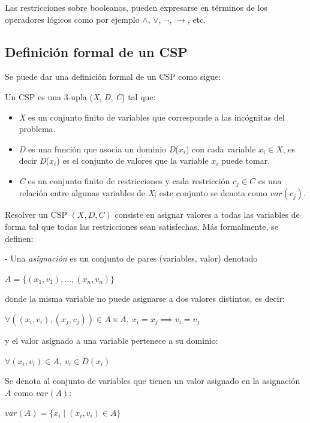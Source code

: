 \documentclass{llncs}
\begin{document}
      Las restricciones sobre booleanos, pueden expresarse en términos de los operadores
      lógicos como por ejemplo $\wedge$, $\lor$, $\neg$, $\rightarrow$, etc.
      
    \subsection{Definición formal de un CSP}
    \label{subsec:cspformal}
      Se puede dar una definición formal de un CSP como sigue:
      
      Un CSP es una 3-upla (\textit{X}, \textit{D}, \textit{C}) tal que:
      \begin{itemize}
        \item \textit{X} es un conjunto finito de variables que corresponde a las incógnitas del problema.
        \item \textit{D} es una función que asocia un dominio \textit{D}($x_i$) con cada variable $x_i \in \textit{X}$, es
        decir \textit{D}($x_i$) es el conjunto de valores que la variable $x_i$ puede tomar.
        \item \textit{C} es un conjunto finito de restricciones y cada restricción $c_j \in C$ es una relación entre
        algunas variables de \textit{X}; este conjunto se denota como $var(c_j).$
      \end{itemize}
  
  	Resolver un CSP $(X, D, C)$ consiste en asignar valores a todas las variables de forma tal
  	que todas las restricciones sean satisfechas. Más formalmente, se definen:
  	
  	- Una \textit{asignación} es un conjunto de pares (variables, valor) denotado
  	\begin{center}
  		{$A = \{(x_1, v_1), ..., (x_n, v_n)\}$} 
  	\end{center}
  	donde la misma variable no puede asignarse a dos valores distintos, es decir:
  	\begin{center}
  		{$\forall((x_i, v_i), (x_j,v_j)) \in A \times A,\ x_i = x_j \implies v_i = v_j$}
  	\end{center}
  	y el valor asignado a una variable pertenece a su dominio:
  	\begin{center}
  		{$\forall(x_i, v_i) \in A,\ v_i \in D(x_i)$}
  	\end{center}
     Se denota al conjunto de variables que tienen un valor asignado en la asignación $A$ como
     $var(A)$:
     \begin{center}
     	$var(A) = \{x_i \mid (x_i, v_i) \in A\}$
     \end{center}
 
\end{document}
